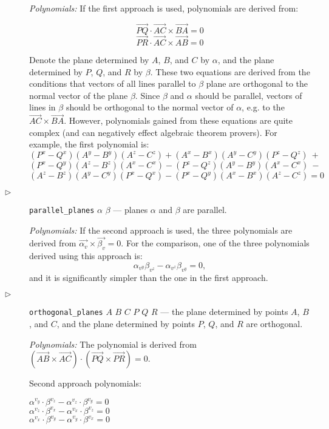 \documentclass{article}
\begin{document}
\begin{description}
{\em Polynomials:} If the first approach is used, polynomials are
derived from:

$$\overrightarrow{PQ}\cdot \overrightarrow{AC} \times \overrightarrow{BA} = 0$$
$$\overrightarrow{PR}\cdot \overrightarrow{AC} \times \overrightarrow{AB} = 0$$

Denote the plane determined by $A$, $B$, and $C$ by $\alpha$, and the
plane determined by $P$, $Q$, and $R$ by $\beta$. These two equations
are derived from the conditions that vectors of all lines parallel to
$\beta$ plane are orthogonal to the normal vector of the plane
$\beta$. Since $\beta$ and $\alpha$ should be parallel, vectors of
lines in $\beta$ should be orthogonal to the normal vector of
$\alpha$, e.g. to the
$\overrightarrow{AC} \times \overrightarrow{BA}$.  However,
polynomials gained from these equations are quite complex (and can
negatively effect algebraic theorem provers). For example, the first
polynomial is:
$$(P^x - Q^x)(A^y - B^y)(A^z - C^z) + (A^x - B^x)(A^y - C^y)(P^z - Q^z) \ +$$
$$(P^x - Q^y)(A^z - B^z)(A^x - C^x) - (P^z - Q^z)(A^y - B^y)(A^x - C^x) \ -$$
$$(A^z - B^z)(A^y - C^y)(P^x - Q^x) - (P^x - Q^y)(A^x - B^x)(A^z - C^z) = 0$$


\item[$\triangleright$] {\tt parallel\_planes} $\alpha$ $\beta$ ---
  planes $\alpha$ and $\beta$ are parallel.

{\em Polynomials:} 
If the second approach is used, the three polynomials are derived from
$\overrightarrow{\alpha_v} \times \overrightarrow{\beta_v} = 0.$ For
the comparison, one of the three polynomials derived using this
approach is:
$$\alpha_{v^y}\beta_{v^z} - \alpha_{v^z}\beta_{v^y} = 0,$$
and it is significantly simpler than the one in the first approach.

\item[$\triangleright$] {\tt orthogonal\_planes} $A$ $B$ $C$ $P$ $Q$ $R$
  --- the plane determined by points $A$, $B$, and $C$, and the plane
  determined by points $P$, $Q$, and $R$ are orthogonal.

  {\em Polynomials:} The polynomial is derived from
  $(\overrightarrow{AB} \times \overrightarrow{AC}) \cdot
  (\overrightarrow{PQ} \times \overrightarrow{PR}) = 0$.

Second approach polynomials:
\begin{tabbing}
$\alpha^{v_y}\cdot \beta^{v_z} - \alpha^{v_z}\cdot \beta^{v_y} = 0$ \\
$\alpha^{v_z}\cdot \beta^{v_x} - \alpha^{v_x}\cdot \beta^{v_z} = 0$ \\
$\alpha^{v_x}\cdot \beta^{v_y} - \alpha^{v_y}\cdot \beta^{v_x} = 0$
\end{tabbing}



\end{description}
\end{document}
